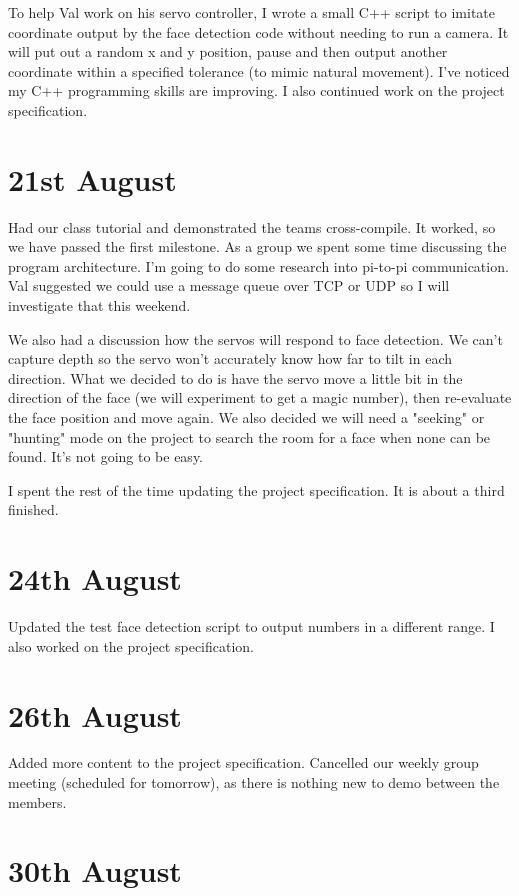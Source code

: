 To help Val work on his servo controller, I wrote a small C++ script to imitate coordinate output by the face detection code without needing to run a camera. It will put out a random x and y position, pause and then output another coordinate within a specified tolerance (to mimic natural movement). I've noticed my C++ programming skills are improving. I also continued work on the project specification.

\section*{21st August}


Had our class tutorial and demonstrated the teams cross-compile. It worked, so we have passed the first milestone. As a group we spent some time discussing the program architecture. I'm going to do some research into pi-to-pi communication. Val suggested we could use a message queue over TCP or UDP so I will investigate that this weekend.

We also had a discussion how the servos will respond to face detection. We can't capture depth so the servo won't accurately know how far to tilt in each direction. What we decided to do is have the servo move a little bit in the direction of the face (we will experiment to get a magic number), then re-evaluate the face position and move again. We also decided we will need a "seeking" or "hunting" mode on the project to search the room for a face when none can be found. It's not going to be easy.

I spent the rest of the time updating the project specification. It is about a third finished.

\section*{24th August}


Updated the test face detection script to output numbers in a different range. I also worked on the project specification.

\section*{26th August}


Added more content to the project specification. Cancelled our weekly group meeting (scheduled for tomorrow), as there is nothing new to demo between the members.

\section*{30th August}

